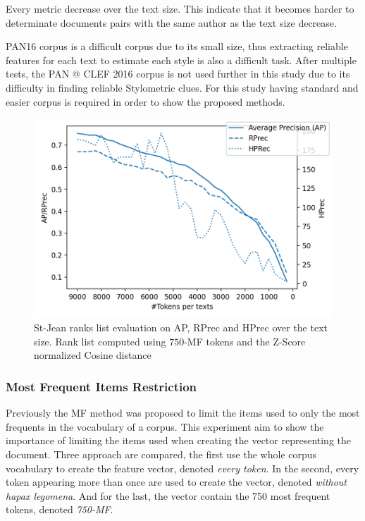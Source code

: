 Every metric decrease over the text size.
This indicate that it becomes harder to determinate documents pairs with the same author as the text size decrease.

PAN16 corpus is a difficult corpus due to its small size, thus extracting reliable features for each text to estimate each style is also a difficult task.
After multiple tests, the PAN @ CLEF 2016 corpus is not used further in this study due to its difficulty in finding reliable Stylometric clues.
For this study having standard and easier corpus is required in order to show the proposed methods.

\begin{figure}
  \centering
  \caption{St-Jean ranks list evaluation on AP, RPrec and HPrec over the text size. Rank list computed using $750$-MF tokens and the Z-Score normalized Cosine distance}
  \label{fig:degradation}
  \includegraphics[width=\linewidth]{img/degradation.png}
\end{figure}

\subsubsection{Most Frequent Items Restriction \label{sec:influance_mf_restriction}}

Previously the MF method was proposed to limit the items used to only the most frequents in the vocabulary of a corpus.
This experiment aim to show the importance of limiting the items used when creating the vector representing the document.
Three approach are compared, the first use the whole corpus vocabulary to create the feature vector, denoted \textit{every token}.
In the second, every token appearing more than once are used to create the vector, denoted \textit{without hapax legomena}.
And for the last, the vector contain the 750 most frequent tokens, denoted \textit{750-MF}.

